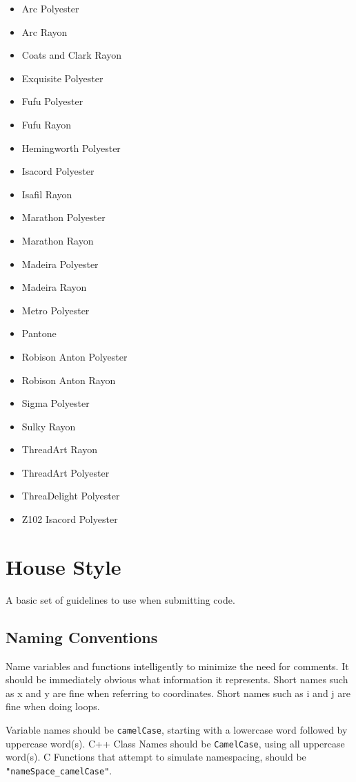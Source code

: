 \documentclass[a4paper]{report}
\begin{document}
\begin{itemize}
\item Arc Polyester
\item Arc Rayon
\item Coats and Clark Rayon
\item Exquisite Polyester
\item Fufu Polyester
\item Fufu Rayon
\item Hemingworth Polyester
\item Isacord Polyester
\item Isafil Rayon
\item Marathon Polyester
\item Marathon Rayon
\item Madeira Polyester
\item Madeira Rayon
\item Metro Polyester
\item Pantone
\item Robison Anton Polyester
\item Robison Anton Rayon
\item Sigma Polyester
\item Sulky Rayon
\item ThreadArt Rayon
\item ThreadArt Polyester
\item ThreaDelight Polyester
\item Z102 Isacord Polyester
\end{itemize}

\section{House Style}

A basic set of guidelines to use when submitting code.

\subsection{Naming Conventions}

Name variables and functions intelligently to minimize the need for comments.
It should be immediately obvious what information it represents.
Short names such as x and y are fine when referring to coordinates.
Short names such as i and j are fine when doing loops.

Variable names should be \texttt{camelCase}, starting with a lowercase word followed by uppercase word(s).
C++ Class Names should be \texttt{CamelCase}, using all uppercase word(s).
C Functions that attempt to simulate namespacing, should be \texttt{"nameSpace\_camelCase"}.
\end{document}
